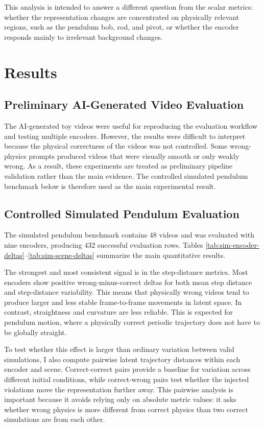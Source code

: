 \documentclass[final-report]{report-template}
\begin{document}
This analysis is intended to answer a different question from the scalar
metrics: whether the representation changes are concentrated on physically
relevant regions, such as the pendulum bob, rod, and pivot, or whether the
encoder responds mainly to irrelevant background changes.

\section{Results}
\subsection{Preliminary AI-Generated Video Evaluation}
The AI-generated toy videos were useful for reproducing the evaluation workflow
and testing multiple encoders. However, the results were difficult to interpret
because the physical correctness of the videos was not controlled. Some
wrong-physics prompts produced videos that were visually smooth or only weakly
wrong. As a result, these experiments are treated as preliminary pipeline
validation rather than the main evidence. The controlled simulated pendulum
benchmark below is therefore used as the main experimental result.

\subsection{Controlled Simulated Pendulum Evaluation}
The simulated pendulum benchmark contains 48 videos and was evaluated with nine
encoders, producing 432 successful evaluation rows. Tables
\ref{tab:sim-encoder-deltas}--\ref{tab:sim-scene-deltas} summarize the main
quantitative results.



The strongest and most consistent signal is in the step-distance metrics. Most
encoders show positive wrong-minus-correct deltas for both mean step distance
and step-distance variability. This means that physically wrong videos tend to
produce larger and less stable frame-to-frame movements in latent space. In
contrast, straightness and curvature are less reliable. This is expected for
pendulum motion, where a physically correct periodic trajectory does not have to
be globally straight.

To test whether this effect is larger than ordinary variation between valid
simulations, I also compute pairwise latent trajectory distances within each
encoder and scene. Correct-correct pairs provide a baseline for variation across
different initial conditions, while correct-wrong pairs test whether the
injected violations move the representation further away. This pairwise
analysis is important because it avoids relying only on absolute metric values:
it asks whether wrong physics is more different from correct physics than two
correct simulations are from each other.
\end{document}

